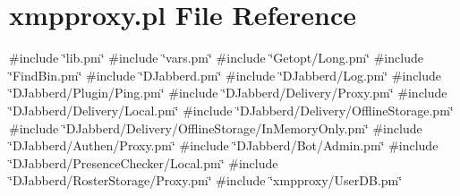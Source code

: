 \hypertarget{xmpproxy_8pl}{
\section{xmpproxy.pl \-File \-Reference}
\label{xmpproxy_8pl}
}
{\ttfamily \#include \char`\"{}lib.\-pm\char`\"{}}\*
{\ttfamily \#include \char`\"{}vars.\-pm\char`\"{}}\*
{\ttfamily \#include \char`\"{}\-Getopt/\-Long.\-pm\char`\"{}}\*
{\ttfamily \#include \char`\"{}\-Find\-Bin.\-pm\char`\"{}}\*
{\ttfamily \#include \char`\"{}\-D\-Jabberd.\-pm\char`\"{}}\*
{\ttfamily \#include \char`\"{}\-D\-Jabberd/\-Log.\-pm\char`\"{}}\*
{\ttfamily \#include \char`\"{}\-D\-Jabberd/\-Plugin/\-Ping.\-pm\char`\"{}}\*
{\ttfamily \#include \char`\"{}\-D\-Jabberd/\-Delivery/\-Proxy.\-pm\char`\"{}}\*
{\ttfamily \#include \char`\"{}\-D\-Jabberd/\-Delivery/\-Local.\-pm\char`\"{}}\*
{\ttfamily \#include \char`\"{}\-D\-Jabberd/\-Delivery/\-Offline\-Storage.\-pm\char`\"{}}\*
{\ttfamily \#include \char`\"{}\-D\-Jabberd/\-Delivery/\-Offline\-Storage/\-In\-Memory\-Only.\-pm\char`\"{}}\*
{\ttfamily \#include \char`\"{}\-D\-Jabberd/\-Authen/\-Proxy.\-pm\char`\"{}}\*
{\ttfamily \#include \char`\"{}\-D\-Jabberd/\-Bot/\-Admin.\-pm\char`\"{}}\*
{\ttfamily \#include \char`\"{}\-D\-Jabberd/\-Presence\-Checker/\-Local.\-pm\char`\"{}}\*
{\ttfamily \#include \char`\"{}\-D\-Jabberd/\-Roster\-Storage/\-Proxy.\-pm\char`\"{}}\*
{\ttfamily \#include \char`\"{}xmpproxy/\-User\-D\-B.\-pm\char`\"{}}\*
